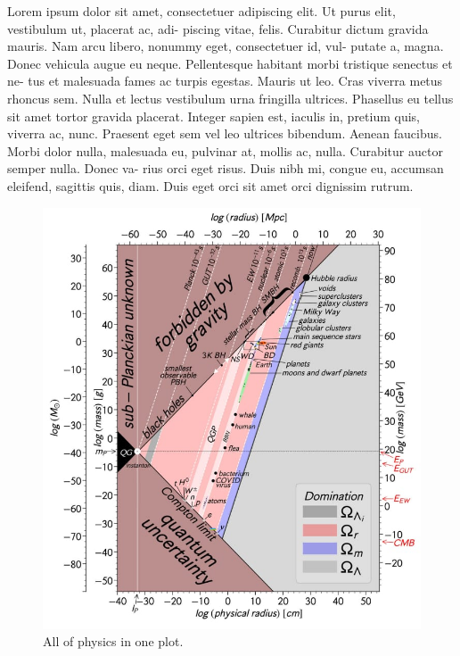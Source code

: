 Lorem ipsum dolor sit amet, consectetuer adipiscing
elit. Ut purus elit, vestibulum ut, placerat ac, adi-
piscing vitae, felis. Curabitur dictum gravida mauris.
Nam arcu libero, nonummy eget, consectetuer id, vul-
putate a, magna. Donec vehicula augue eu neque.
Pellentesque habitant morbi tristique senectus et ne-
tus et malesuada fames ac turpis egestas. Mauris ut
leo. Cras viverra metus rhoncus sem. Nulla et lectus
vestibulum urna fringilla ultrices. Phasellus eu tellus
sit amet tortor gravida placerat. Integer sapien est,
iaculis in, pretium quis, viverra ac, nunc. Praesent
eget sem vel leo ultrices bibendum. Aenean faucibus.
Morbi dolor nulla, malesuada eu, pulvinar at, mollis
ac, nulla. Curabitur auctor semper nulla. Donec va-
rius orci eget risus. Duis nibh mi, congue eu, accumsan
eleifend, sagittis quis, diam. Duis eget orci sit amet
orci dignissim rutrum. \citep{aghanim2020planck}


\lipsum[1-2]

\begin{figure}
  \centering
  \includegraphics[width=1\columnwidth]{images/physics.jpg}  %
  \caption{\small All of physics in one plot.}
  \label{fig:1}
\end{figure}

\lipsum[1-2]

